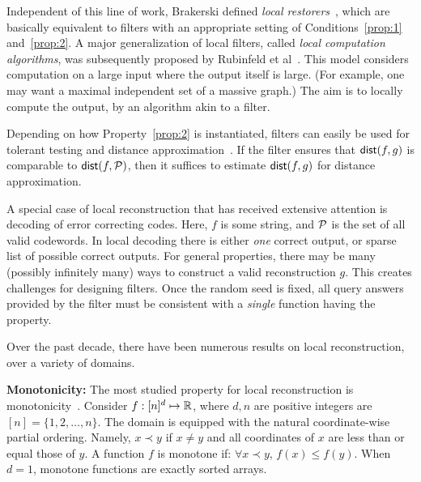 \documentclass[natbib]{svcyclop}
\def\dist{{\sf dist}}
\begin{document}
Independent of this line of work, Brakerski defined \emph{local restorers}~\cite{Br08}, which are basically
equivalent to filters with an appropriate setting of Conditions~\ref{prop:1} and~\ref{prop:2}.
A major generalization of local filters, called \emph{local computation algorithms}, was subsequently proposed
by Rubinfeld et al~\cite{RuTaVa+11}. This model considers computation on a large input where the output itself
is large. (For example, one may want a maximal independent set of a massive graph.) 
The aim is to locally compute the output, by an algorithm akin to a filter.

Depending on how Property~\ref{prop:2} is instantiated, filters
can easily be used for tolerant testing and distance approximation~\cite{PRR04}. If the filter ensures
that $\dist(f,g)$ is comparable to $\dist(f,\cP)$, then it suffices to estimate $\dist(f,g)$
for distance approximation. 
%

A special case of local reconstruction that has received extensive attention is decoding of error correcting codes. 
Here, $f$ is some string, and $\mathcal{P}$ is the set of all valid codewords. 
In local decoding there is either \emph{one} correct output, or 
sparse list of possible correct outputs. For general properties,
there may be many (possibly infinitely many) ways
to construct a valid reconstruction $g$. This creates challenges
for designing filters. Once the random seed is fixed, all query answers
provided by the filter must be consistent with a {\em single} function
having the property.



\KeyRes

Over the past decade, there have been numerous results on local reconstruction,
over a variety of domains. 

{\bf Monotonicity:} The most studied property for local reconstruction
is monotonicity~\cite{ACCL2,SS06,BhGr+12,AwJh+12}. Consider $f:[n]^d \mapsto \mathbb{R}$,
where $d,n$ are positive integers are $[n] = \{1,2,\ldots,n\}$. The domain
is equipped with the natural coordinate-wise partial ordering. Namely, $x \prec y$
if $x \neq y$ and all coordinates of $x$ are less than or equal those of $y$. A function $f$
is monotone if: $\forall x \prec y$, $f(x) \leq f(y)$. When $d=1$,
monotone functions are exactly sorted arrays.
\end{document}
